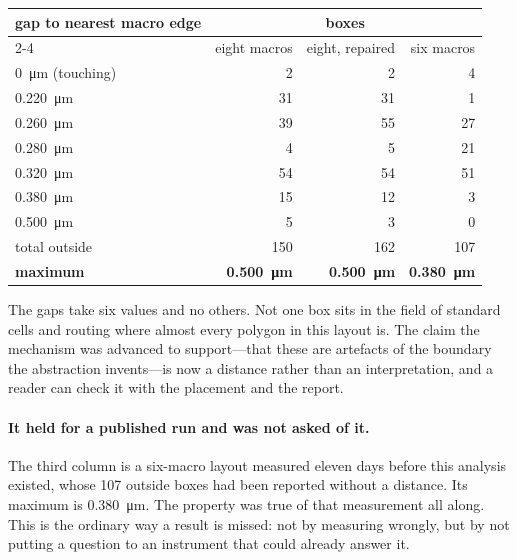 \documentclass[11pt,a4paper]{article}
\begin{document}
\begin{center}
\begin{tabular}{lrrr}
\toprule
gap to nearest macro edge & \multicolumn{3}{c}{boxes} \\
\cmidrule(l){2-4}
 & eight macros & eight, repaired & six macros \\
\midrule
\SI{0}{\micro\meter} (touching) & 2  & 2  & 4  \\
\SI{0.220}{\micro\meter}        & 31 & 31 & 1  \\
\SI{0.260}{\micro\meter}        & 39 & 55 & 27 \\
\SI{0.280}{\micro\meter}        & 4  & 5  & 21 \\
\SI{0.320}{\micro\meter}        & 54 & 54 & 51 \\
\SI{0.380}{\micro\meter}        & 15 & 12 & 3  \\
\SI{0.500}{\micro\meter}        & 5  & 3  & 0  \\
\midrule
total outside                   & \num{150} & \num{162} & \num{107} \\
\textbf{maximum}                & \textbf{\SI{0.500}{\micro\meter}}
                                & \textbf{\SI{0.500}{\micro\meter}}
                                & \textbf{\SI{0.380}{\micro\meter}} \\
\bottomrule
\end{tabular}
\end{center}

The gaps take six values and no others. Not one box sits in the field of
standard cells and routing where almost every polygon in this layout is.
The claim the mechanism was advanced to support---that these are
artefacts of the boundary the abstraction invents---is now a distance
rather than an interpretation, and a reader can check it with the
placement and the report.

\paragraph{It held for a published run and was not asked of it.} The
third column is a six-macro layout measured eleven days before this
analysis existed, whose \num{107} outside boxes had been reported without
a distance. Its maximum is \SI{0.380}{\micro\meter}. The property was
true of that measurement all along. This is the ordinary way a result is
missed: not by measuring wrongly, but by not putting a question to an
instrument that could already answer it.
\end{document}
